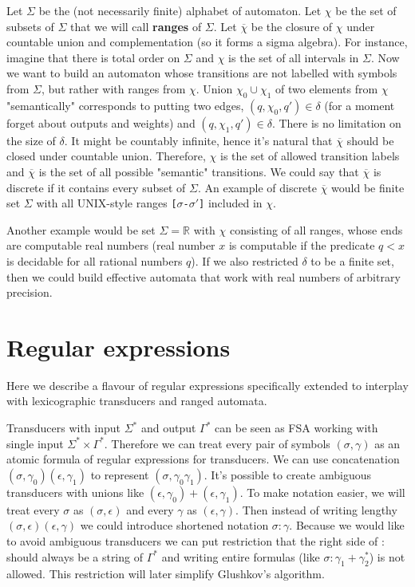 \documentclass[journal]{journal}
\begin{document}
Let $\Sigma$ be the (not necessarily finite) alphabet of automaton. Let $\chi$ be the set of subsets of $\Sigma$ that we will call \textbf{ranges} of $\Sigma$. Let  $\overline{\chi}$ be  the closure of $\chi$ under countable union and complementation (so it forms a sigma algebra). For instance, imagine that there is total order on $\Sigma$ and  $\chi$ is the set of all intervals in $\Sigma$. Now we want to build an automaton whose transitions are not labelled with symbols from $\Sigma$, but rather with ranges from $\chi$. Union $\chi_0\cup\chi_1$ of two elements from $\chi$ "semantically" corresponds to putting two edges, $(q,\chi_0,q')\in\delta$ (for a moment forget about outputs and weights) and $(q,\chi_1,q')\in\delta$. There is no limitation on the size of $\delta$. It might be countably infinite, hence it's natural that $\overline{\chi}$ should be closed under countable union. Therefore, $\chi$ is the set of allowed transition labels and $\overline{\chi}$ is the set of all possible "semantic" transitions. We could say that $\overline{\chi}$ is discrete if it contains every subset of $\Sigma$. An example of discrete $\overline{\chi}$ would be finite set $\Sigma$ with all UNIX-style ranges \texttt{[$\sigma$-$\sigma'$]} included in $\chi$. 

Another example would be set $\Sigma=\mathbb{R}$ with $\chi$ consisting of all ranges, whose ends are computable real numbers (real number $x$ is computable if the predicate $q<x$ is decidable for all rational numbers $q$). If we also restricted $\delta$ to be a finite set, then we could build effective automata that work with real numbers of arbitrary precision. 



\section{Regular expressions}

Here we describe a flavour of regular expressions specifically extended to interplay with lexicographic transducers and ranged automata. 

Transducers with input $\Sigma^*$ and output $\Gamma^*$ can be seen as FSA working with single input $\Sigma^* \times \Gamma^*$. Therefore we can treat every pair of symbols $(\sigma,\gamma)$ as an atomic formula of regular expressions for transducers. We can use concatenation $(\sigma,\gamma_0)(\epsilon,\gamma_1)$ to represent $(\sigma,\gamma_0\gamma_1)$. It's possible to create ambiguous transducers with unions like  $(\epsilon,\gamma_0)+(\epsilon,\gamma_1)$.  To make notation easier, we will treat every $\sigma$ as $(\sigma,\epsilon)$ and every $\gamma$ as $(\epsilon,\gamma)$. Then instead of writing lengthy $(\sigma,\epsilon)(\epsilon,\gamma)$ we could introduce shortened notation $\sigma:\gamma$. Because we would like to avoid ambiguous transducers we can put restriction that the right side of $:$ should always be a string of $\Gamma^*$ and writing entire formulas (like $\sigma:\gamma_1+\gamma_2^*$) is not allowed. This restriction will later simplify Glushkov's algorithm. 
\end{document}

